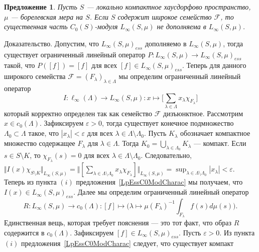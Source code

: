 \documentclass[12pt]{article}
\numberwithin{equation}{subsection}
\theoremstyle{plain}
\newtheorem{proposition}{Предложение}
\newenvironment{proof}{Доказательство.}{}
\begin{document}
\begin{fulltext}
    \begin{proposition}\label{LInfEssNotCompl} Пусть $S$ --- локально компактное
        хаусдорфово пространст\-во, $\mu$ --- борелевская мера на $S$. Если $S$
        содержит широкое семейство $\mathcal{F}$, то существенная часть
        $C_0(S)$-модуля $L_\infty(S,\mu)$ не дополняема в $L_\infty(S,\mu)$.
    \end{proposition}
    \begin{proof} Допустим, что ${L_\infty(S,\mu)}_{ess}$ дополняемо в
        $L_\infty(S,\mu)$, тогда существует ограниченный линейный оператор
        $P:L_\infty(S,\mu)\to {L_\infty(S,\mu)}_{ess}$ такой, что $P([f])=[f]$
        для всех $[f]\in {L_\infty(S,\mu)}_{ess}$. Теперь для данного широкого
        семейства $\mathcal{F}={(F_\lambda)}_{\lambda\in\Lambda}$ мы определим
        ограниченный линейный оператор
        $$
            I:\ell_\infty(\Lambda)\to L_\infty(S,\mu):
            x\mapsto \biggl[
                \sum_{\lambda\in\Lambda}x_\lambda \chi_{F_\lambda}
                \biggr]
        $$
        который корректно определен так как семейство $\mathcal{F}$ дизъюнктное.
        Рассмотрим $x\in c_0(\Lambda)$. Зафиксируем $\varepsilon > 0$, тогда
        существует конечное подмножество $\Lambda_0\subset\Lambda$ такое, что
        $|x_\lambda|<\varepsilon$ для всех
        $\lambda\in\Lambda\setminus\Lambda_0$. Пусть $K_\lambda$ обозначает
        компактное множество содержащее $F_\lambda$ для $\lambda\in\Lambda$.
        Тогда $K_0=\bigcup_{\lambda\in\Lambda_0}K_\lambda$ --- компакт. Если
        $s\in S\setminus K$, то $\chi_{F_\lambda}(s)=0$ для всех
        $\lambda\in\Lambda\setminus\Lambda_0$. Следовательно, $\Vert
            I(x)\chi_{S\setminus K}\Vert_{L_\infty(S,\mu)}
            =\Vert[\sum_{\lambda\in\Lambda\setminus\Lambda_0}
                x_\lambda\chi_{F_\lambda}]\Vert_{L_\infty(S,\mu)}
            =\sup_{\lambda\in\Lambda\setminus\Lambda_0}|x_\lambda|<\varepsilon$.
        Теперь из пункта $(i)$ предложения~\ref{LpEssC0ModCharac} мы получаем,
        что $I(x)\in {L_\infty(S,\mu)}_{ess}$. Далее мы определим ограниченный
        линейный оператор
        $$
            R:L_\infty(S,\mu)\to c_0(\Lambda):
            [f]\mapsto \biggl(
            \lambda\mapsto{\mu(F_\lambda)}^{-1}\int_{F_\lambda} f(s)d\mu(s)
            \biggr).
        $$
        Единственная вещь, которая требует пояснения --- это тот факт, что образ
        $R$ содержится в $c_0(\Lambda)$. Зафиксируем $[f]\in
            {L_\infty(S,\mu)}_{ess}$. Пусть $\varepsilon>0$. Из пункта $(i)$
        предложения~\ref{LpEssC0ModCharac} следует, что существует компакт

\end{proof}
\end{fulltext}
\end{document}

